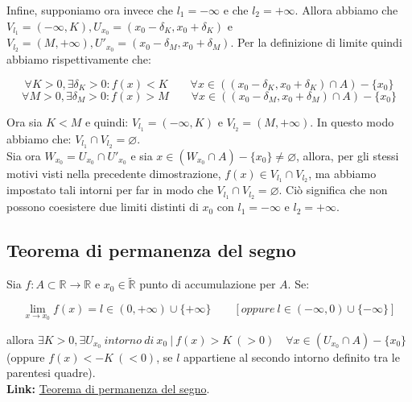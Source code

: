 \documentclass{article}
\begin{document}
\noindent Infine, supponiamo ora invece che $l_1 = -\infty$ e che $l_2 = +\infty$. Allora abbiamo che $V_{l_1} = (- \infty, K), U_{x_0} = (x_0 - \delta_K, x_0 + \delta_K)$ e $V_{l_2} = (M, +\infty), U'_{x_0} = (x_0 - \delta_M, x_0 + \delta_M)$. Per la definizione di limite quindi abbiamo rispettivamente che: 

\begin{equation*}
    \forall K > 0, \exists \delta_K > 0 : f(x) < K \qquad \forall x \in ((x_0 - \delta_K, x_0 + \delta_K) \cap A) - \{x_0\}
\end{equation*}
\begin{equation*}
    \forall M > 0, \exists \delta_M > 0 : f(x) > M \qquad \forall x \in ((x_0 - \delta_M, x_0 + \delta_M) \cap A) - \{x_0\}
\end{equation*}

\noindent Ora sia $K < M$ e quindi: $V_{l_1} = (-\infty, K)$ e $V_{l_2} = (M, +\infty)$. In questo modo abbiamo che: $V_{l_1} \cap V_{l_2} = \varnothing$.\\
Sia ora $W_{x_0} = U_{x_0} \cap U'_{x_0}$ e sia $x \in (W_{x_0} \cap A) - \{x_0\} \neq \varnothing$, allora, per gli stessi motivi visti nella precedente dimostrazione, $f(x) \in V_{l_1} \cap V_{l_2}$, ma abbiamo impostato tali intorni per far in modo che $V_{l_1} \cap V_{l_2} = \varnothing$. Ciò significa che non possono coesistere due limiti distinti di $x_0$ con $l_1 = - \infty$ e $l_2 = +\infty$.\\

\subsection{Teorema di permanenza del segno}
Sia $f: A \subset \mathbb{R} \xrightarrow{} \mathbb{R}$ e $x_0 \in \widetilde{\mathbb{R}}$ punto di accumulazione per $A$. Se:

\begin{equation*}
    \lim_{x \to x_0} f(x) = l \in (0, + \infty) \cup \{+\infty\} \qquad [oppure \ 
 l \in (- \infty, 0) \cup \{-\infty\}]
\end{equation*}

\noindent allora $\exists K > 0, \exists U_{x_0} \ intorno \ di \ x_0 \ | \ f(x) > K \ (> 0) \quad \forall x \in (U_{x_0} \cap A) - \{x_0\}$ (oppure $f(x) < -K \ (< 0)$, se $l$ appartiene al secondo intorno definito tra le parentesi quadre).\\

\noindent\textbf{Link:} \href{https://www.geogebra.org/m/qbgp526U}{Teorema di permanenza del segno}.
\end{document}
